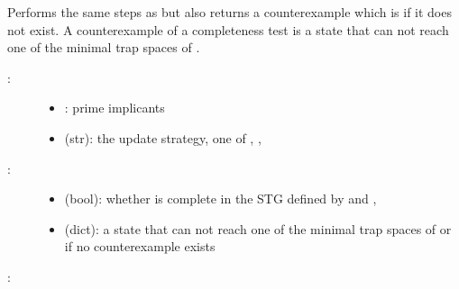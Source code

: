 \documentclass[letterpaper,10pt,english]{sphinxmanual}
\begin{document}
\begin{fulllineitems}
\label{\detokenize{Attractors:PyBoolNet.Attractors.completeness_with_counterexample}}
Performs the same steps as {\hyperref[\detokenize{Attractors:completeness}]{}} but also returns a counterexample which is  if it does not exist.
A counterexample of a completeness test is a state that can not reach one of the minimal trap spaces of .
\begin{description}
\item[{:}] \leavevmode\begin{itemize}
\item {} 
: prime implicants

\item {} 
 (str): the update strategy, one of , , 

\end{itemize}

\item[{:}] \leavevmode\begin{itemize}
\item {} 
 (bool): whether  is complete in the STG defined by  and ,

\item {} 
 (dict): a state that can not reach one of the minimal trap spaces of  or  if no counterexample exists

\end{itemize}

\end{description}

:

\begin{sphinxVerbatim}[commandchars=\\\{\}]
    
\end{sphinxVerbatim}

\end{fulllineitems}
\end{document}
